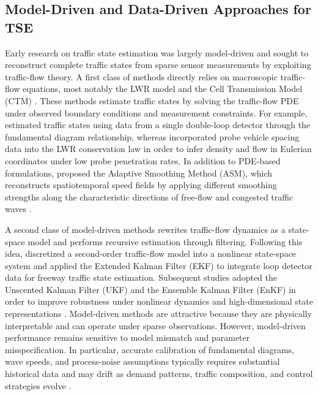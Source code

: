\documentclass[a4paper,fleqn]{cas-sc}
\numberwithin{equation}{section}
\begin{document}
\subsection{Model-Driven and Data-Driven Approaches for TSE}

Early research on traffic state estimation was largely model-driven and sought to reconstruct complete traffic states from sparse sensor measurements by exploiting traffic-flow theory. A first class of methods directly relies on macroscopic traffic-flow equations, most notably the LWR model \citep{lighthill1955kinematic, richards1956shock} and the Cell Transmission Model (CTM) \citep{daganzo1995cell}. These methods estimate traffic states by solving the traffic-flow PDE under observed boundary conditions and measurement constraints. For example, \citet{coifman2002estimating} estimated traffic states using data from a single double-loop detector through the fundamental diagram relationship, whereas \citet{seo2015probe} incorporated probe vehicle spacing data into the LWR conservation law in order to infer density and flow in Eulerian coordinates under low probe penetration rates. In addition to PDE-based formulations, \citet{treiber2003adaptive} proposed the Adaptive Smoothing Method (ASM), which reconstructs spatiotemporal speed fields by applying different smoothing strengths along the characteristic directions of free-flow and congested traffic waves \citep{treiber2002reconstructing, treiber2011reconstructing}.

A second class of model-driven methods rewrites traffic-flow dynamics as a state-space model and performs recursive estimation through filtering. Following this idea, \citet{wang2005real} discretized a second-order traffic-flow model \citep{papageorgiou1990modelling} into a nonlinear state-space system and applied the Extended Kalman Filter (EKF) to integrate loop detector data for freeway traffic state estimation. Subsequent studies adopted the Unscented Kalman Filter (UKF) and the Ensemble Kalman Filter (EnKF) in order to improve robustness under nonlinear dynamics and high-dimensional state representations \citep{mihaylova2006unscented, work2008ensemble}. Model-driven methods are attractive because they are physically interpretable and can operate under sparse observations. However, model-driven performance remains sensitive to model mismatch and parameter misspecification. In particular, accurate calibration of fundamental diagrams, wave speeds, and process-noise assumptions typically requires substantial historical data and may drift as demand patterns, traffic composition, and control strategies evolve \citep{yuan2021macroscopic, di2023physics}.
\end{document}
